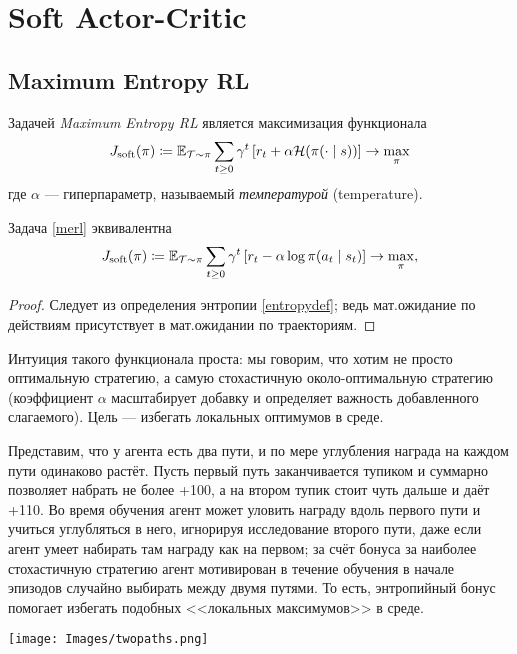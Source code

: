 \section{Soft Actor-Critic}\label{SACsection}

\subsection{Maximum Entropy RL}\label{maximumentropyrlsubsection}

\begin{definition}
Задачей \emph{Maximum Entropy RL} является максимизация функционала
\begin{equation}\label{merl}
    J_{\mathrm{soft}}(\pi) \coloneqq \mathbb{E}_{\mathcal{T} \sim \pi} \sum_{t \ge 0} \gamma^t \left[ r_t + \alpha \mathcal{H}(\pi(\cdot \mid s)) \right] \to \max_\pi
\end{equation}
где $\alpha$ --- гиперпараметр, называемый \emph{температурой} (temperature).
\end{definition}

\begin{proposition}
Задача \eqref{merl} эквивалентна
\begin{equation*}
    J_{\mathrm{soft}}(\pi) \coloneqq \mathbb{E}_{\mathcal{T} \sim \pi} \sum_{t \ge 0} \gamma^t \left[ r_t - \alpha \log \pi(a_t \mid s_t) \right] \to \max_\pi,
\end{equation*}
\begin{proof}
Следует из определения энтропии \eqref{entropydef}; ведь мат.ожидание по действиям присутствует в мат.ожидании по траекториям.
\end{proof}
\end{proposition}

Интуиция такого функционала проста: мы говорим, что хотим не просто оптимальную стратегию, а самую стохастичную около-оптимальную стратегию (коэффициент $\alpha$ масштабирует добавку и определяет важность добавленного слагаемого). Цель --- избегать локальных оптимумов в среде. 

\begin{exampleBox}[righthand ratio=0.3, sidebyside, sidebyside align=center, lower separated=false]{}
Представим, что у агента есть два пути, и по мере углубления награда на каждом пути одинаково растёт. Пусть первый путь заканчивается тупиком и суммарно позволяет набрать не более +100, а на втором тупик стоит чуть дальше и даёт +110. Во время обучения агент может уловить награду вдоль первого пути и учиться углубляться в него, игнорируя исследование второго пути, даже если агент умеет набирать там награду как на первом; за счёт бонуса за наиболее стохастичную стратегию агент мотивирован в течение обучения в начале эпизодов случайно выбирать между двумя путями. То есть, энтропийный бонус помогает избегать подобных <<локальных максимумов>> в среде.

\tcblower
\texttt{[image: Images/twopaths.png]}
\end{exampleBox}

